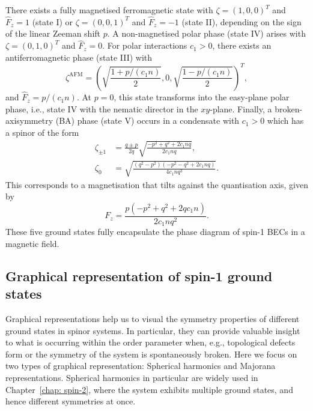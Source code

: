 There exists a fully magnetised ferromagnetic state with \(\zeta={(1, 0, 0)}^T\)
and \(\hat{F}_z=1\) (state I) or \(\zeta={(0, 0, 1)}^T\) and \(\hat{F}_z=-1\)
(state II), depending on the sign of the linear Zeeman shift \(p\).
A non-magnetised polar phase (state IV) arises with \(\zeta={(0, 1, 0)}^T\) and
\(\hat{F}_z = 0\).
For polar interactions \(c_1 > 0\), there exists an antiferromagnetic phase
(state III) with
\begin{equation}\label{eq: AFM-spinor}
    \zeta^\mathrm{AFM} = {\left(\sqrt{\frac{1 + p/(c_1n)}{2}}, 0,
    \sqrt{\frac{1 - p/(c_1n)}{2}}\right)}^T,
\end{equation}
and \(\hat{F}_z = p/(c_1n)\).
At \(p=0\), this state transforms into the easy-plane polar phase, i.e., state
IV with the nematic director in the \(xy\)-plane.
Finally, a broken-axisymmetry (BA) phase (state V) occurs in a condensate with
\(c_1 > 0\) which has a spinor of the form
\begin{equation}
    \begin{aligned}
        \zeta_{\pm 1} & =
        \frac{q \pm p}{2q}\sqrt{\frac{-p^2+q^2+2c_1nq}{2c_1nq}},              \\
        \zeta_0       & = \sqrt{\frac{(q^2-p^2)(-p^2-q^2+2c_1nq)}{4c_1nq^3}}.
    \end{aligned}
    \label{eq: BA-spinor}
\end{equation}
This corresponds to a magnetisation that tilts against the quantisation axis,
given by
\begin{equation}
    F_z = \frac{p(-p^2 + q^2 + 2qc_1n)}{2c_1nq^2}.
\end{equation}
These five ground states fully encapsulate the phase diagram of spin-1 BECs
in a magnetic field.

\subsection{Graphical representation of spin-1 ground states}
Graphical representations help us to visual the symmetry properties of different
ground states in spinor systems.
In particular, they can provide valuable insight to what is occurring within
the order parameter when, e.g., topological defects form or the symmetry of the
system is spontaneously broken.
Here we focus on two types of graphical representation: Spherical harmonics and
Majorana representations.
Spherical harmonics in particular are widely used in Chapter~\ref{chap: spin-2},
where the system exhibits multiple ground states, and hence different symmetries
at once.

